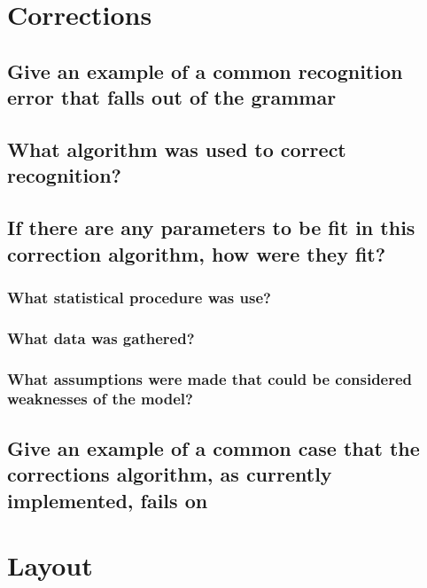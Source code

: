 \documentclass[]{article}
\begin{document}
\section{Corrections}

\subsection{Give an example of a common recognition error that falls out of the grammar}

\subsection{What algorithm was used to correct recognition?}

\subsection{If there are any parameters to be fit in this correction algorithm, how were they fit?}

\subsubsection{What statistical procedure was use?}

\subsubsection{What data was gathered?}

\subsubsection{What assumptions were made that could be considered weaknesses of the model?}

\subsection{Give an example of a common case that the corrections algorithm, as currently implemented, fails on}


\section{Layout}
\end{document}
